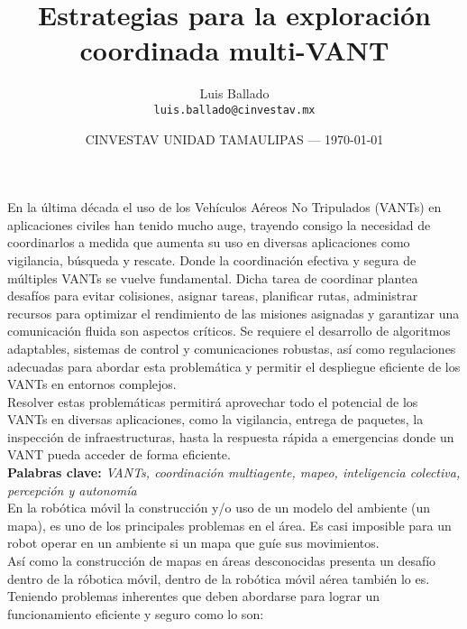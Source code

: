 \documentclass{article}
\title{Estrategias para la exploración coordinada multi-VANT}
\author{Luis Ballado\\ \texttt{luis.ballado@cinvestav.mx}} %
\date{CINVESTAV UNIDAD TAMAULIPAS --- \today}
\begin{document}
\maketitle

En la última década el uso de los Vehículos Aéreos No Tripulados (VANTs) en aplicaciones civiles han tenido mucho auge, trayendo consigo la necesidad de coordinarlos a medida que aumenta su uso en diversas aplicaciones como vigilancia, búsqueda y rescate. Donde la coordinación efectiva y segura de múltiples VANTs se vuelve fundamental. Dicha tarea de coordinar plantea desafíos para evitar colisiones, asignar tareas, planificar rutas, administrar recursos para optimizar el rendimiento de las misiones asignadas y garantizar una comunicación fluida son aspectos críticos. Se requiere el desarrollo de algoritmos adaptables, sistemas de control y comunicaciones robustas, así como regulaciones adecuadas para abordar esta problemática y permitir el despliegue eficiente de los VANTs en entornos complejos.\\

Resolver estas problemáticas permitirá aprovechar todo el potencial de los VANTs en diversas aplicaciones, como la vigilancia, entrega de paquetes, la inspección de infraestructuras, hasta la respuesta rápida a emergencias donde un VANT pueda acceder de forma eficiente.\\

\textbf{Palabras clave: } \textit{VANTs, coordinación multiagente, mapeo, inteligencia colectiva, percepción y autonomía}\\

En la robótica móvil la construcción y/o uso de un modelo del ambiente (un mapa), es uno de los principales problemas en el área. Es casi imposible para un robot operar en un ambiente si un mapa que guíe sus movimientos.\\

Así como la construcción de mapas en áreas desconocidas presenta un desafío dentro de la róbotica móvil, dentro de la robótica móvil aérea también lo es. Teniendo problemas inherentes que deben abordarse para lograr un funcionamiento eficiente y seguro como lo son:
\end{document}
